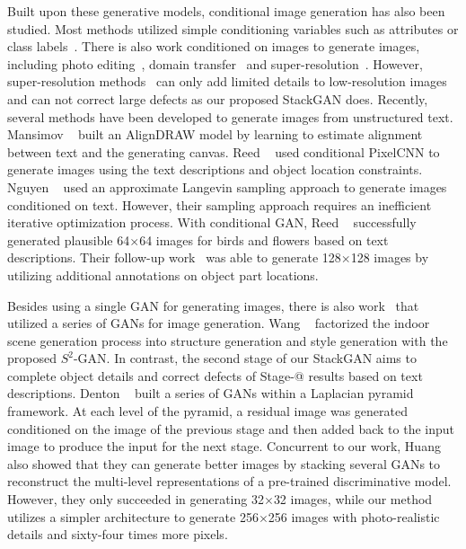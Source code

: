 Built upon these generative models, conditional image generation has also been studied. Most methods utilized simple conditioning variables such as attributes or class labels~\cite{YanYSL16, Oord16, ChenDHSSA16, Odena2016}. There is also work conditioned on images to generate images, including photo editing~\cite{Brock2016, ZhuKSE16}, domain transfer~\cite{Taigmaniclr17, pix2pix2017} and super-resolution~\cite{Casper2016, Christian2016}. However, super-resolution methods~\cite{Casper2016, Christian2016} can only add limited details to low-resolution images and can not correct large defects as our proposed StackGAN does. Recently, several methods have been developed to generate images from unstructured text. Mansimov \etal~\cite{MansimovPBS15} built an AlignDRAW model by learning to estimate alignment between text and the generating canvas.  Reed \etal~\cite{reed2016iclr17} used conditional PixelCNN to generate images using the text descriptions and object location constraints. Nguyen \etal~\cite{NguyenYBDC17} used an approximate Langevin sampling approach to generate images conditioned on text. However, their sampling approach requires an inefficient iterative optimization process. With conditional GAN, Reed \etal~\cite{reed2016generative} successfully generated plausible 64$\times$64 images for birds and flowers based on text descriptions. Their follow-up work~\cite{reed2016learning} was able to generate 128$\times$128 images by utilizing additional annotations on object part locations.

Besides using a single GAN for generating images, there is also work~\cite{WangG16, DentonCSF15,huang2016sgan} that utilized a series of GANs for image generation. Wang \etal~\cite{WangG16} factorized the indoor scene generation process into structure generation and style generation with the proposed $S^2$-GAN. In contrast, the second stage of our StackGAN aims to complete object details and correct defects of Stage-\expandafter\@slowromancap{}@ results based on text descriptions. Denton \etal~\cite{DentonCSF15} built a series of GANs within a Laplacian pyramid framework. At each level of the pyramid, a residual image was generated conditioned on the image of the previous stage and then added back to the input image to produce the input for the next stage. Concurrent to our work, Huang \etal~\cite{huang2016sgan} also showed that they can generate better images by stacking several GANs to reconstruct the multi-level representations of a pre-trained discriminative model. However, they only succeeded in generating 32$\times$32 images, while our method utilizes a simpler architecture to generate 256$\times$256 images with photo-realistic details and sixty-four times more pixels.

